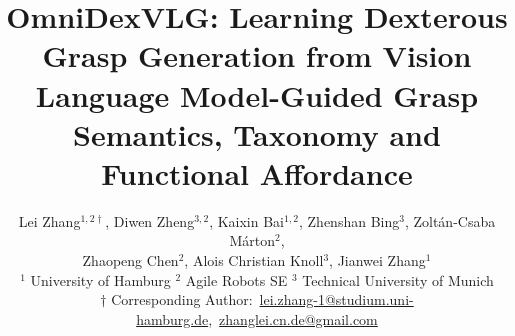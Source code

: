 \documentclass[a4,journal]{IEEEtran}
\begin{document}
\title{OmniDexVLG: Learning Dexterous Grasp Generation from Vision Language Model-Guided Grasp Semantics, Taxonomy and Functional Affordance}




\author{
{ 
Lei Zhang$^{1,2\dagger}$,
Diwen Zheng$^{3,2}$,
Kaixin Bai$^{1,2}$,
Zhenshan Bing$^{3}$,
Zoltán-Csaba Márton$^{2}$,\\
Zhaopeng Chen$^2$,
Alois Christian Knoll$^{3}$,
Jianwei Zhang$^1$}\\
{\small
$^1$ University of Hamburg \quad
$^2$ Agile Robots SE \quad 
$^3$ Technical University of Munich
}\\[0.1em]
{\small $\dag$ Corresponding Author:~\href{mailto:lei.zhang-1@studium.uni-hamburg.de}
     {\textcolor{green!60!black}{lei.zhang-1@studium.uni-hamburg.de}},~\href{mailto:zhanglei.cn.de@gmail.com}
     {\textcolor{green!60!black}{zhanglei.cn.de@gmail.com}}}
}
\end{document}
